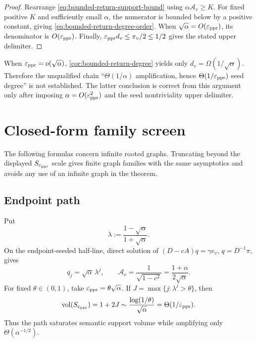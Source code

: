 \documentclass[11pt]{article}
\begin{document}
\begin{proof}
Rearrange \eqref{eq:bounded-return-support-bound} using
$\alpha\mathcal A_v\ge K$.  For fixed positive $K$ and sufficiently small
$\alpha$, the numerator is bounded below by a positive constant, giving
\eqref{eq:bounded-return-degree-order}.  When
$\sqrt\alpha=O(\varepsilon_{\mathrm{ppr}})$, its denominator is $O(\varepsilon_{\mathrm{ppr}})$.  Finally,
$\varepsilon_{\mathrm{ppr}} d_v\le\pi_v/2\le1/2$ gives the stated upper delimiter.
\end{proof}

\begin{remark}
\label{rem:bounded-return-regime}
When $\varepsilon_{\mathrm{ppr}}=o(\sqrt\alpha)$,
\cref{cor:bounded-return-degree} yields only
$d_v=\Omega(1/\sqrt\alpha)$.  Therefore the unqualified chain
``$\Theta(1/\alpha)$ amplification, hence
$\Theta(1/\varepsilon_{\mathrm{ppr}})$ seed degree'' is not established.  The latter conclusion
is correct from this argument only after imposing
$\alpha=O(\varepsilon_{\mathrm{ppr}}^2)$ and the seed nontriviality upper delimiter.
\end{remark}

\section{Closed-form family screen}
\label{sec:bounded-return-families}

The following formulas concern infinite rooted graphs.  Truncating beyond the
displayed $S_{\varepsilon_{\mathrm{ppr}}}$ scale gives finite graph families with the same
asymptotics and avoids any use of an infinite graph in the theorem.

\subsection{Endpoint path}

Put
\begin{equation}
 \lambda:=\frac{1-\sqrt\alpha}{1+\sqrt\alpha}.
 \label{eq:bounded-return-path-decay}
\end{equation}
On the endpoint-seeded half-line, direct solution of
$(D-cA)q=\gamma e_v$, $q=D^{-1}\pi$, gives
\begin{equation}
 q_j=\sqrt\alpha\,\lambda^j,
 \qquad
 \mathcal A_v=\frac{1}{\sqrt{1-c^2}}
 =\frac{1+\alpha}{2\sqrt\alpha}.
 \label{eq:bounded-return-path-formula}
\end{equation}
For fixed $\theta\in(0,1)$, take
$\varepsilon_{\mathrm{ppr}}=\theta\sqrt\alpha$.  If
$J=\max\{j:\lambda^j>\theta\}$, then
\[
 \operatorname{vol}(S_{\varepsilon_{\mathrm{ppr}}})=1+2J
 \sim\frac{\log(1/\theta)}{\sqrt\alpha}
 =\Theta(1/\varepsilon_{\mathrm{ppr}}).
\]
Thus the path saturates semantic support volume while amplifying only
$\Theta(\alpha^{-1/2})$.
\end{document}
